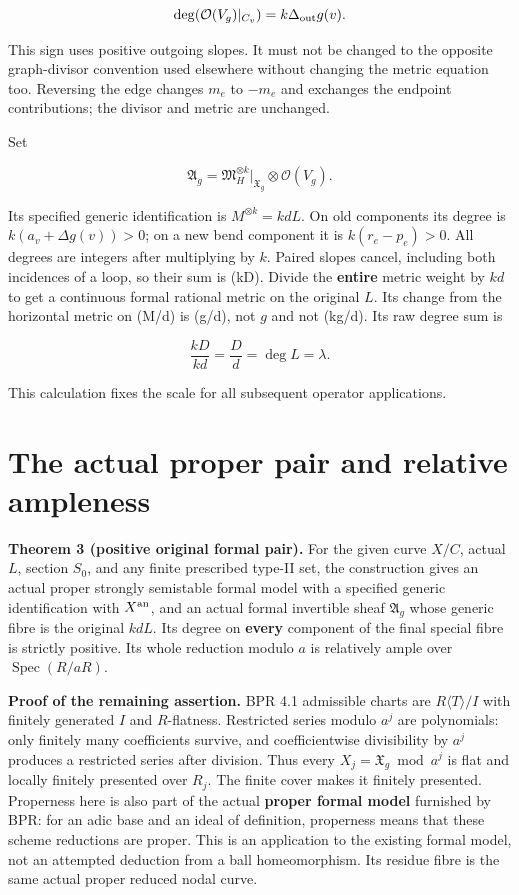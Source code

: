 \documentclass[
  11pt,
]{article}
\begin{document}
\[
 \deg(\mathcal O(V_g)|_{C_v})
       =k\Delta_{\rm out}g(v).
\]

This sign uses positive outgoing slopes. It must not be changed to the
opposite graph-divisor convention used elsewhere without changing the
metric equation too. Reversing the edge changes \(m_e\) to \(-m_e\) and
exchanges the endpoint contributions; the divisor and metric are
unchanged.

Set

\[
 \mathfrak A_g=\mathfrak M_H^{\otimes k}|_{\mathfrak X_g}
               \otimes\mathcal O(V_g).
\]

Its specified generic identification is \(M^{\otimes k}=kdL\). On old
components its degree is \(k(a_v+\Delta g(v))>0\); on a new bend
component it is \(k(r_e-p_e)>0\). All degrees are integers after
multiplying by \(k\). Paired slopes cancel, including both incidences of
a loop, so their sum is (kD). Divide the \textbf{entire} metric weight
by \(kd\) to get a continuous formal rational metric on the original
\(L\). Its change from the horizontal metric on (M/d) is (g/d), not
\(g\) and not (kg/d). Its raw degree sum is

\[
 \frac{kD}{kd}=\frac Dd=\deg L=\lambda.
\]

This calculation fixes the scale for all subsequent operator
applications.

\section{The actual proper pair and relative
ampleness}\label{the-actual-proper-pair-and-relative-ampleness}

\textbf{Theorem 3 (positive original formal pair).} For the given curve
\(X/C\), actual \(L\), section \(S_0\), and any finite prescribed
type-II set, the construction gives an actual proper strongly semistable
formal model with a specified generic identification with
\(X^{\rm an}\), and an actual formal invertible sheaf \(\mathfrak A_g\)
whose generic fibre is the original \(kdL\). Its degree on
\textbf{every} component of the final special fibre is strictly
positive. Its whole reduction modulo \(a\) is relatively ample over
\(\operatorname{Spec}(R/aR)\).

\textbf{Proof of the remaining assertion.} BPR 4.1 admissible charts are
\(R\langle T\rangle/I\) with finitely generated \(I\) and
\(R\)-flatness. Restricted series modulo \(a^j\) are polynomials: only
finitely many coefficients survive, and coefficientwise divisibility by
\(a^j\) produces a restricted series after division. Thus every
\(X_j=\mathfrak X_g\bmod a^j\) is flat and locally finitely presented
over \(R_j\). The finite cover makes it finitely presented. Properness
here is also part of the actual \textbf{proper formal model} furnished
by BPR: for an adic base and an ideal of definition, properness means
that these scheme reductions are proper. This is an application to the
existing formal model, not an attempted deduction from a ball
homeomorphism. Its residue fibre is the same actual proper reduced nodal
curve.
\end{document}
